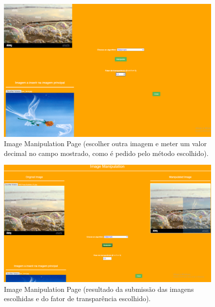 \documentclass{report}
\begin{document}
    \begin{figure}[!hbtp]
        \centering 
        \includegraphics[scale=0.29]{Images_code/0 - image manipulation 4.png}
        \caption{\label{Image Manipulation}Image Manipulation Page (escolher outra imagem e meter um valor decimal no campo mostrado, como é pedido pelo método escolhido).}
    \end{figure}

    \begin{figure}[!hbtp]
        \centering 
        \includegraphics[scale=0.29]{Images_code/0 - image manipulation 5.png}
        \caption{\label{Image Manipulation}Image Manipulation Page (resultado da submissão das imagens escolhidas e do fator de transparência escolhido).}
    \end{figure}
\end{document}
